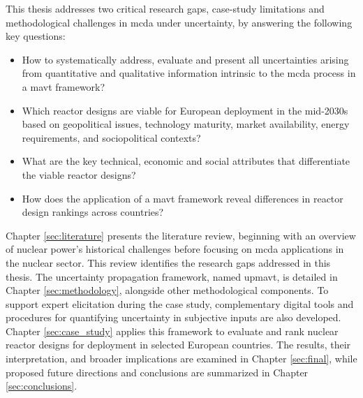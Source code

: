 This thesis addresses two critical research gaps, case-study limitations and methodological challenges in \gls{mcda} under uncertainty, by answering the following key questions:
\begin{itemize}
    \item How to systematically address, evaluate and present all uncertainties arising from quantitative and qualitative information intrinsic to the \gls{mcda} process in a \gls{mavt} framework?
    \item Which reactor designs are viable for European deployment in the mid-2030s based on geopolitical issues, technology maturity, market availability, energy requirements, and sociopolitical contexts?
    \item What are the key technical, economic and social attributes that differentiate the viable reactor designs?
    \item How does the application of a \gls{mavt} framework reveal differences in reactor design rankings across countries?
\end{itemize}

Chapter \ref{sec:literature} presents the literature review, beginning with an overview of nuclear power’s historical challenges before focusing on \gls{mcda} applications in the nuclear sector. This review identifies the research gaps addressed in this thesis. The uncertainty propagation framework, named \gls{upmavt}, is detailed in Chapter \ref{sec:methodology}, alongside other methodological components. To support expert elicitation during the case study, complementary digital tools and procedures for quantifying uncertainty in subjective inputs are also developed. Chapter \ref{sec:case_study} applies this framework to evaluate and rank nuclear reactor designs for deployment in selected European countries. The results, their interpretation, and broader implications are examined in Chapter \ref{sec:final}, while proposed future directions and conclusions are summarized in Chapter \ref{sec:conclusions}.
